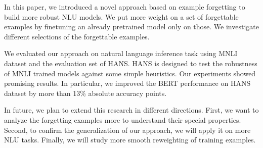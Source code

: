 
In this paper, we introduced a novel approach based on example forgetting to build more robust NLU models.
We put more weight on a set of forgettable examples by finetuning
an already pretrained model only on those.
We investigate different selections of the forgettable examples.

We evaluated our approach on natural language inference task using  MNLI dataset and the evaluation set of HANS.
HANS is designed to test the robustness of MNLI trained models 
against some simple heuristics.
Our experiments showed promising results. In particular, we improved the BERT performance
on HANS dataset by more than 13\% absolute accuracy points.

In future, we plan to extend this research in different directions.
First, we want to analyze the forgetting examples more to understand their special properties.
Second, to confirm the generalization of our approach, we will apply it on more NLU tasks.
Finally, we will study more smooth reweighting of training examples.












